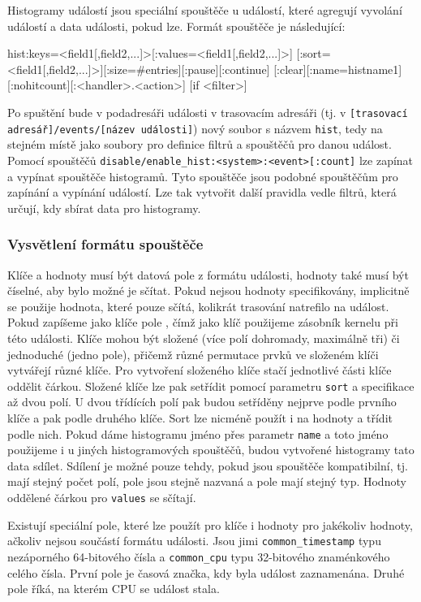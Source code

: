Histogramy událostí jsou speciální spouštěče u událostí, které agregují vyvolání událostí a data události, pokud lze. Formát spouštěče je následující:
\begin{code}
hist:keys=<field1[,field2,...]>[:values=<field1[,field2,...]>]
  [:sort=<field1[,field2,...]>][:size=#entries][:pause][:continue]
  [:clear][:name=histname1][:nohitcount][:<handler>.<action>]
  [if <filter>]
\end{code}
Po spuštění bude v podadresáři události v trasovacím adresáři (tj. v \texttt{[trasovací adresář]/events/[název události]}) nový soubor s názvem \texttt{hist}, tedy na stejném místě jako soubory pro definice filtrů a spouštěčů pro danou událost. Pomocí spouštěčů \texttt{disable/enable\_hist:<system>:<event>[:count]} lze zapínat a vypínat spouštěče histogramů. Tyto spouštěče jsou podobné spouštěčům pro zapínání a vypínání událostí. Lze tak vytvořit další pravidla vedle filtrů, která určují, kdy sbírat data pro histogramy.

\subsubsection*{Vysvětlení formátu spouštěče}
Klíče a hodnoty musí být datová pole z formátu události, hodnoty také musí být číselné, aby bylo možné je sčítat. Pokud nejsou hodnoty specifikovány, implicitně se použije  hodnota, které pouze sčítá, kolikrát trasování natrefilo na událost. Pokud zapíšeme jako klíče pole , čímž jako klíč použijeme zásobník kernelu při této události. Klíče mohou být složené (více polí dohromady, maximálně tři) či jednoduché (jedno pole), přičemž různé permutace prvků ve složeném klíči vytvářejí různé klíče. Pro vytvoření složeného klíče stačí jednotlivé části klíče oddělit čárkou. Složené klíče lze pak setřídit pomocí parametru \texttt{sort} a specifikace až dvou polí. U dvou třídících polí pak budou setříděny nejprve podle prvního klíče a pak podle druhého klíče. Sort lze nicméně použít i na hodnoty a třídit podle nich. Pokud dáme histogramu jméno přes parametr \texttt{name} a toto jméno použijeme i u jiných histogramových spouštěčů, budou vytvořené histogramy tato data sdílet. Sdílení je možné pouze tehdy, pokud jsou spouštěče kompatibilní, tj. mají stejný počet polí, pole jsou stejně nazvaná a pole mají stejný typ. Hodnoty oddělené čárkou pro \texttt{values} se sčítají.

Existují speciální pole, které lze použít pro klíče i hodnoty pro jakékoliv hodnoty, ačkoliv nejsou součástí formátu události. Jsou jimi \texttt{common\_timestamp} typu nezáporného 64-bitového čísla a \texttt{common\_cpu} typu 32-bitového znaménkového celého čísla. První pole je časová značka, kdy byla událost zaznamenána. Druhé pole říká, na kterém CPU se událost stala.

